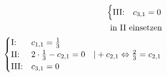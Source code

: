\begin{align*}
\begin{cases}
        \text{III:\@} & c_{3,1} = 0
    \end{cases}                             \\
    \text{in II einsetzen}                                                                                      \\
    \begin{cases}
        \text{I:\@}   & c_{1,1} = \frac{1}{3}                                                                       \\
        \text{II:\@}  & 2 \cdot \frac{1}{3} - c_{2, 1} = 0 \quad | +c_{2, 1} \Leftrightarrow \frac{2}{3} = c_{2, 1} \\
        \text{III:\@} & c_{3,1} = 0
    \end{cases} \\
\end{align*}

